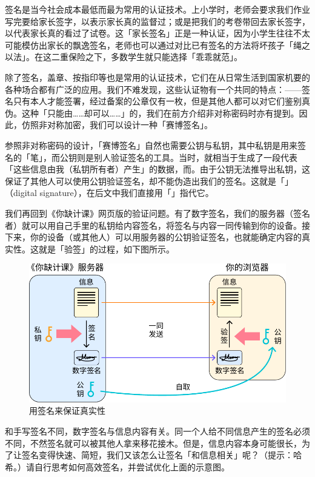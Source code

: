 签名是当今社会成本最低而最为常用的认证技术。上小学时，老师会要求我们作业写完要给家长签字，以表示家长真的监督过；或是把我们的考卷带回去家长签字，以代表家长真的看过了试卷。这「家长签名」正是一种认证，因为小学生往往不太可能模仿出家长的飘逸签名，老师也可以通过对比已有签名的方法将坏孩子「绳之以法」。在这二重保险之下，多数学生就只能选择「乖乖就范」。

除了签名，盖章、按指印等也是常用的认证技术，它们在从日常生活到国家机要的各种场合都有广泛的应用。我们不难发现，这些认证物有一个共同的特点：——签名只有本人才能签署，经过备案的公章仅有一枚，但是其他人都可以对它们鉴别真伪。这种「只能由……却可以……」的，我们在前方介绍非对称密码时亦有提到。因此，仿照非对称加密，我们可以设计一种「赛博签名」。

参照非对称密码的设计，「赛博签名」自然也需要公钥与私钥，其中私钥是用来签名的「笔」，而公钥则是别人验证签名的工具。当时，就相当于生成了一段代表「这些信息由我（私钥所有者）产生」的数据，而。由于公钥无法推导出私钥，这保证了其他人可以使用公钥验证签名，却不能伪造出我们的签名。这就是「」（digital signature），在后文中我们直接用「」指代它。

我们再回到《你缺计课》网页版的验证问题。有了数字签名，我们的服务器（签名者）就可以用自己手里的私钥给内容签名，将签名与内容一同传输到你的设备。接下来，你的设备（或其他人）可以用服务器的公钥验证签名，也就能确定内容的真实性。这就是「验签」的过程，如下图所示。

\begin{figure}[htb!]
  \centering
  \includegraphics[width=.65\textwidth]{assets/surpass/Signing.pdf}
  \caption{用签名来保证真实性}
  \label{fig:Signing}
\end{figure}

\begin{note}
  和手写签名不同，数字签名与信息内容有关。同一个人给不同信息产生的签名必须不同，不然签名就可以被其他人拿来移花接木。但是，信息内容本身可能很长，为了让签名变得快速、简短，我们又该怎么让签名「和信息相关」呢？（提示：哈希。）请自行思考如何高效签名，并尝试优化上面的示意图。
\end{note}

